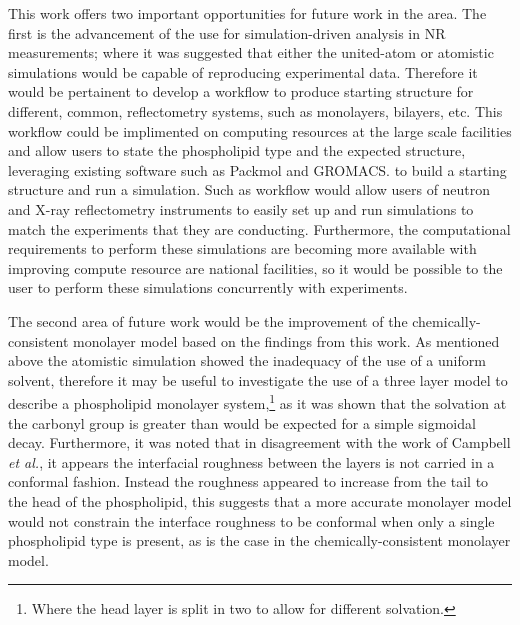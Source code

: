 This work offers two important opportunities for future work in the area.
The first is the advancement of the use for simulation-driven analysis in NR measurements; where it was suggested that either the united-atom or atomistic simulations would be capable of reproducing experimental data.
Therefore it would be pertainent to develop a workflow to produce starting structure for different, common, reflectometry systems, such as monolayers, bilayers, etc.
This workflow could be implimented on computing resources at the large scale facilities and allow users to state the phospholipid type and the expected structure, leveraging existing software such as Packmol and GROMACS.\autocite[in a similar fashion the building of a monolayer in this work]{martinez_packmol_2009,lindahl_gromacs_2001} to build a starting structure and run a simulation.
Such as workflow would allow users of neutron and X-ray reflectometry instruments to easily set up and run simulations to match the experiments that they are conducting.
Furthermore, the computational requirements to perform these simulations are becoming more available with improving compute resource are national facilities, so it would be possible to the user to perform these simulations concurrently with experiments.

The second area of future work would be the improvement of the chemically-consistent monolayer model based on the findings from this work.
As mentioned above the atomistic simulation showed the inadequacy of the use of a uniform solvent, therefore it may be useful to investigate the use of a three layer model to describe a phospholipid monolayer system,\footnote{Where the head layer is split in two to allow for different solvation.} as it was shown that the solvation at the carbonyl group is greater than would be expected for a simple sigmoidal decay.
Furthermore, it was noted that in disagreement with the work of Campbell \emph{et al.},\autocite{campbell_structure_2018} it appears the interfacial roughness between the layers is not carried in a conformal fashion.
Instead the roughness appeared to increase from the tail to the head of the phospholipid, this suggests that a more accurate monolayer model would not constrain the interface roughness to be conformal when only a single phospholipid type is present, as is the case in the chemically-consistent monolayer model.

